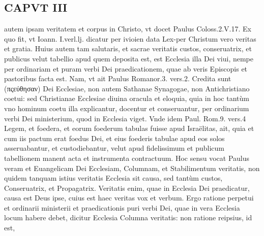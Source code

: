 \documentclass{article}
\begin{document}
\begin{pages}
\section*{CAPVT  III }
\marginpar{[ p.171 ]}\pstart autem ipsam veritatem et corpus in Christo, vt docet Paulus Coloss.2.V.17. Ex quo fit, vt Ioann. I.verl.lj. dicatur per ivioien data Lex-per Christum vero veritas et gratia.  \pend\pstart Huius autem tam salutaris, et sacrae veritatis custos, conseruatrix, et publicus velut tabellio apud quem deposita est, est Ecclesia illa Dei viui, nempe per ordinariam et puram verbi Dei praedicationem, quae ab veris Episcopis et pastoribus facta est. Nam, vt ait Paulus Romanor.3. vers.2. Credita sunt (πςεύθησαν) Dei Ecclesiae, non autem Sathanae Synagogae, non Antichristiano coetui: sed Christianae Ecclesiae diuina oracula et eloquia, quia in hoc tantùm vno hominum coetu illa explicantur, docentur et conseruantur, per ordinarium verbi Dei ministerium, quod in Ecclesia viget. Vnde idem Paul. Rom.9. vers.4 Legem, et foedera, et eorum foederum tabulas fuisse apud Israëlitas, ait, quia et cum iis pactum erat foedus Dei, et eius foederis tabulae apud eos solos asseruabantur, et custodiebantur, velut apud fidelissimum et publicum tabellionem manent acta et instrumenta contractuum. Hoc sensu vocat Paulus veram et Euangelicam Dei Ecclesiam, Columnam, et Stabilimentum veritatis, non quidem tanquam istius veritatis Ecclesia sit causa, sed tantùm custos, Conseruatrix, et Propagatrix. Veritatis enim, quae in Ecclesia Dei praedicatur, causa est Deus ipse, cuius est haec veritas vox et verbum. Ergo ratione perpetui et ordinarii ministerii et praedicationis puri verbi Dei, quae in vera Ecclesia locum habere debet, dicitur Ecclesia Columna veritatis: non ratione reipsius, id est,  \pend

\end{pages}
\end{document}
